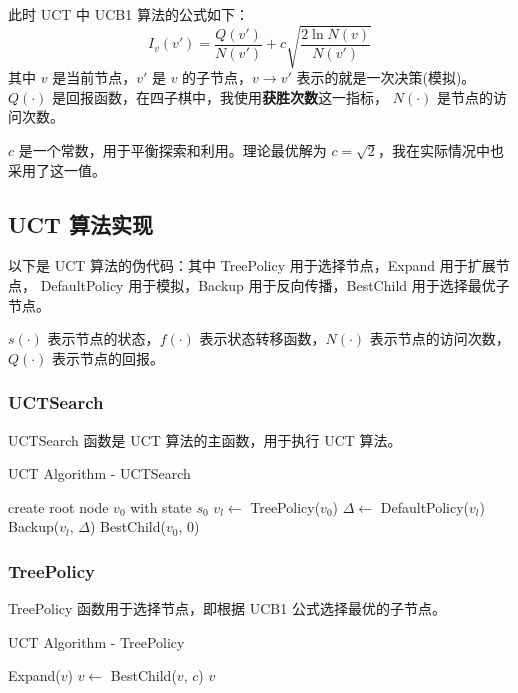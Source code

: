 \documentclass[UTF8]{ctexart}
\begin{document}
此时 UCT 中 UCB1 算法的公式如下：
\begin{equation}
    I_v(v') = \frac{Q(v')}{N(v')} + c\sqrt{\frac{2\ln N(v)}{N(v')}} \tag{2}
\end{equation}
其中 $v$ 是当前节点，$v'$ 是 $v$ 的子节点，$v \to v'$ 表示的就是一次决策(模拟)。
$Q(\cdot)$ 是回报函数，在四子棋中，我使用\textbf{获胜次数}这一指标，
$N(\cdot)$ 是节点的访问次数。

$c$ 是一个常数，用于平衡探索和利用。理论最优解为 $c = \sqrt{2}$，我在实际情况中也采用了这一值。

\subsection{UCT 算法实现}

以下是 UCT 算法的伪代码：其中 TreePolicy 用于选择节点，Expand 用于扩展节点，
DefaultPolicy 用于模拟，Backup 用于反向传播，BestChild 用于选择最优子节点。

$s(\cdot)$ 表示节点的状态，$f(\cdot)$ 表示状态转移函数，$N(\cdot)$ 表示节点的访问次数，
$Q(\cdot)$ 表示节点的回报。

\subsubsection{UCTSearch}

UCTSearch 函数是 UCT 算法的主函数，用于执行 UCT 算法。

\begin{algorithm}[H]
    \caption{UCT Algorithm - UCTSearch}
    \begin{algorithmic}
            \State create root node $v_0$ with state $s_0$
                \State $v_l \gets$ TreePolicy($v_0$)
                \State $\Delta \gets$ DefaultPolicy($v_l$)
                \State Backup($v_l$, $\Delta$)
            \EndWhile
            \State \Return BestChild($v_0$, $0$)
        \EndFunction
    \end{algorithmic}
\end{algorithm}

\subsubsection{TreePolicy}

TreePolicy 函数用于选择节点，即根据 UCB1 公式选择最优的子节点。

\begin{algorithm}[H]
    \caption{UCT Algorithm - TreePolicy}
    \begin{algorithmic}
                    \State \Return Expand($v$)
                \Else
                    \State $v \gets$ BestChild($v$, $c$)
                \EndIf
            \EndWhile
            \State \Return $v$
        \EndFunction
    \end{algorithmic}
\end{algorithm}
\end{document}
